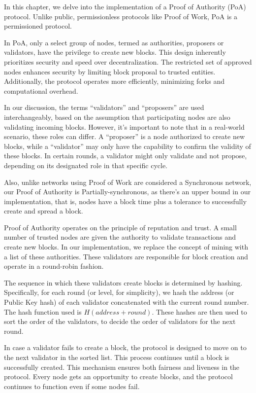 In this chapter, we delve into the implementation of a Proof of Authority (PoA) protocol. Unlike public, permissionless protocols like Proof of Work, PoA is a permissioned protocol. 

In PoA, only a select group of nodes, termed as authorities, proposers or validators, have the privilege to create new blocks. This design inherently prioritizes security and speed over decentralization. The restricted set of approved nodes enhances security by limiting block proposal to trusted entities. Additionally, the protocol operates more efficiently, minimizing forks and computational overhead.

In our discussion, the terms ``validators'' and ``proposers'' are used interchangeably, based on the assumption that participating nodes are also validating incoming blocks. However, it's important to note that in a real-world scenario, these roles can differ. A ``proposer'' is a node authorized to create new blocks, while a ``validator'' may only have the capability to confirm the validity of these blocks. In certain rounds, a validator might only validate and not propose, depending on its designated role in that specific cycle.


Also, unlike networks using Proof of Work are considered a Synchronous network, our Proof of Authority is Partially-synchronous, as there's an upper bound in our implementation, that is, nodes have a block time plus a tolerance to successfully create and spread a block.

Proof of Authority operates on the principle of reputation and trust. A small number of trusted nodes are given the authority to validate transactions and create new blocks. In our implementation, we replace the concept of mining with a list of these authorities. These validators are responsible for block creation and operate in a round-robin fashion.

The sequence in which these validators create blocks is determined by hashing. Specifically, for each round (or level, for simplicity), we hash the address (or Public Key hash) of each validator concatenated with the current round number. The hash function used is $H(address + round)$. These hashes are then used to sort the order of the validators, to decide the order of validators for the next round.

In case a validator fails to create a block, the protocol is designed to move on to the next validator in the sorted list. This process continues until a block is successfully created. This mechanism ensures both fairness and liveness in the protocol. Every node gets an opportunity to create blocks, and the protocol continues to function even if some nodes fail.

